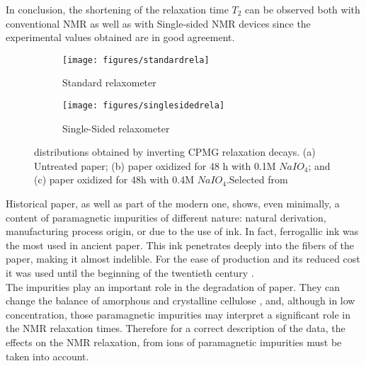 \documentclass[a4paper,11pt]{report}
\begin{document}
In conclusion, the shortening of the relaxation time $T_2$ can be observed both with conventional NMR as well as with Single-sided NMR devices since the experimental values obtained are in good agreement.

\begin{figure}[h]

\begin{subfigure}{0.5\textwidth}
\texttt{[image: figures/standardrela]} 
\caption{Standard relaxometer}

\end{subfigure}
\begin{subfigure}{0.5\textwidth}
\texttt{[image: figures/singlesidedrela]}
\caption{Single-Sided relaxometer}

\end{subfigure}
 


\caption{distributions obtained by inverting CPMG relaxation decays. (a) Untreated paper; (b) paper oxidized for 48 h with 0.1M $NaIO_4$; and (c) paper oxidized for 48h with 0.4M $NaIO_4$.Selected from \cite{settepaper}}\label{paper1}
\end{figure}
Historical paper, as well as part of the modern one, shows, even minimally, a content of paramagnetic impurities of different nature: natural derivation, manufacturing process origin, or due to the use of ink. In fact, ferrogallic ink was the most used in ancient paper. This ink penetrates deeply into the fibers of the paper, making it almost indelible. For the ease of production and its reduced cost it was used until the beginning of the twentieth century\cite{trepaper} . \\
The impurities play an important role in the degradation of paper. They can change the balance of amorphous and crystalline cellulose , and, although in low concentration, those paramagnetic impurities may interpret a significant role in the NMR relaxation times. Therefore for a correct description of the data, the effects on the NMR relaxation, from ions of paramagnetic impurities must be taken into account\cite{duepaper}.  
\end{document}
